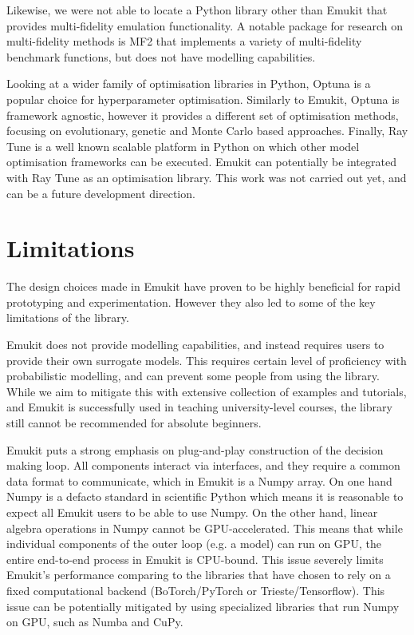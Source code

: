 Likewise, we were not able to locate a Python library other than Emukit that provides multi-fidelity emulation functionality. A notable package for research on multi-fidelity methods is MF2 \cite{vanRijn2020} that implements a variety of multi-fidelity benchmark functions, but does not have modelling capabilities.

Looking at a wider family of optimisation libraries in Python, Optuna \cite{optuna_2019} is a popular choice for hyperparameter optimisation. Similarly to Emukit, Optuna is framework agnostic, however it provides a different set of optimisation methods, focusing on evolutionary, genetic and Monte Carlo based approaches. Finally, Ray Tune \cite{liaw2018tune} is a well known scalable platform in Python on which other model optimisation frameworks can be executed. Emukit can potentially be integrated with Ray Tune as an optimisation library. This work was not carried out yet, and can be a future development direction.

 

\section{Limitations}\label{section:limitations}
The design choices made in Emukit have proven to be highly beneficial for rapid prototyping and experimentation. However they also led to some of the key limitations of the library.

Emukit does not provide modelling capabilities, and instead requires users to provide their own surrogate models. This requires certain level of proficiency with probabilistic modelling, and can prevent some people from using the library. While we aim to mitigate this with extensive collection of examples and tutorials, and Emukit is successfully used in teaching university-level courses, the library still cannot be recommended for absolute beginners.

Emukit puts a strong emphasis on plug-and-play construction of the decision making loop. All components interact via interfaces, and they require a common data format to communicate, which in Emukit is a Numpy array. On one hand Numpy is a defacto standard in scientific Python which means it is reasonable to expect all Emukit users to be able to use Numpy. On the other hand, linear algebra operations in Numpy cannot be GPU-accelerated. This means that while individual components of the outer loop  (e.g. a model) can run on GPU, the entire end-to-end process in Emukit is CPU-bound. This issue severely limits Emukit's performance comparing to the libraries that have chosen to rely on a fixed computational backend (BoTorch/PyTorch or Trieste/Tensorflow). This issue can be potentially mitigated by using specialized libraries that run Numpy on GPU, such as Numba and CuPy.

